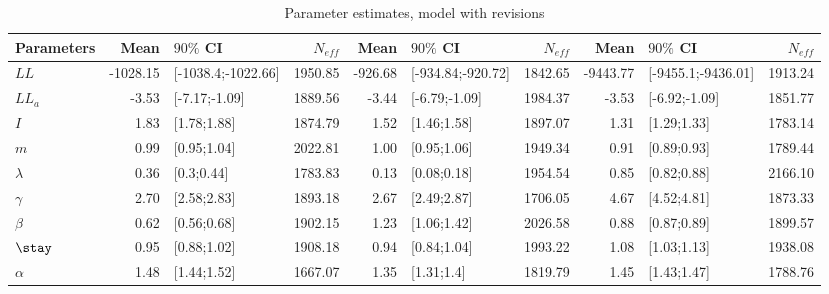 \begin{table}

\caption{Parameter estimates, model with revisions}
\centering
\begin{tabular}[t]{lrlrrlrrlr}
\toprule
Parameters & Mean & $90\%$ CI & $N_{eff}$ & Mean & $90\%$ CI & $N_{eff}$ & Mean & $90\%$ CI & $N_{eff}$\\
\midrule
$LL$ & -1028.15 & {}[-1038.4;-1022.66] & 1950.85 & -926.68 & {}[-934.84;-920.72] & 1842.65 & -9443.77 & {}[-9455.1;-9436.01] & 1913.24\\
$LL_a$ & -3.53 & {}[-7.17;-1.09] & 1889.56 & -3.44 & {}[-6.79;-1.09] & 1984.37 & -3.53 & {}[-6.92;-1.09] & 1851.77\\
$I$ & 1.83 & {}[1.78;1.88] & 1874.79 & 1.52 & {}[1.46;1.58] & 1897.07 & 1.31 & {}[1.29;1.33] & 1783.14\\
$m$ & 0.99 & {}[0.95;1.04] & 2022.81 & 1.00 & {}[0.95;1.06] & 1949.34 & 0.91 & {}[0.89;0.93] & 1789.44\\
$\lambda$ & 0.36 & {}[0.3;0.44] & 1783.83 & 0.13 & {}[0.08;0.18] & 1954.54 & 0.85 & {}[0.82;0.88] & 2166.10\\
\addlinespace
$\gamma$ & 2.70 & {}[2.58;2.83] & 1893.18 & 2.67 & {}[2.49;2.87] & 1706.05 & 4.67 & {}[4.52;4.81] & 1873.33\\
$\beta$ & 0.62 & {}[0.56;0.68] & 1902.15 & 1.23 & {}[1.06;1.42] & 2026.58 & 0.88 & {}[0.87;0.89] & 1899.57\\
$\stay$ & 0.95 & {}[0.88;1.02] & 1908.18 & 0.94 & {}[0.84;1.04] & 1993.22 & 1.08 & {}[1.03;1.13] & 1938.08\\
$\alpha$ & 1.48 & {}[1.44;1.52] & 1667.07 & 1.35 & {}[1.31;1.4] & 1819.79 & 1.45 & {}[1.43;1.47] & 1788.76\\
\bottomrule
\end{tabular}
\end{table}
